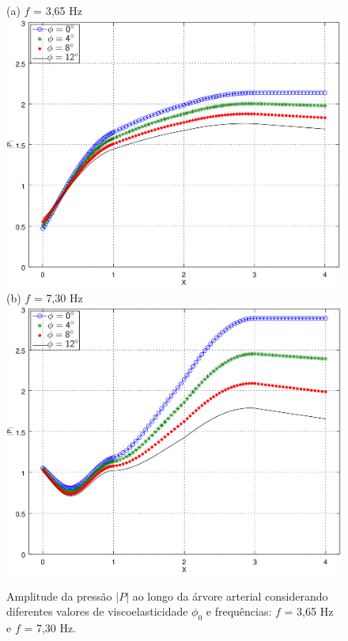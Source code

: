 \begin{figure}[!htbp]
	\centering
	(a) $f$ = 3,65 Hz \\
	\includegraphics[scale=0.7]{Figures/fig4_P_f3_65_viscoelasticity_NEW.png}\\
	(b)  $f$ = 7,30 Hz\\
	\includegraphics[scale=0.7]{Figures/fig4_P_f7_30_viscoelasticity_NEW.png}\\
	\caption{Amplitude da pressão $|P|$ ao longo da árvore arterial considerando diferentes valores de viscoelasticidade $\phi_0$ e frequências: $f$ = 3,65 Hz e  $f$ = 7,30 Hz. }
	\label{fig4a:arterial-tree}%
\end{figure}

